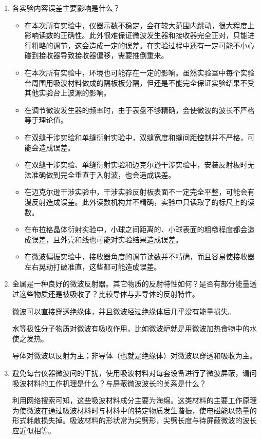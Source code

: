 \documentclass[12pt]{article}
\begin{document}
\begin{enumerate}
    \item {\kaishu 各实验内容误差主要影响是什么？}
    
    \begin{itemize}
        \item 在本次所有实验中，仪器示数不稳定，会在较大范围内跳动，很大程度上影响读数的正确性。此外很难保证微波发生器和接收器完全正对，只能进行粗略的调节，这会造成一定的误差。在实验过程中还有一定可能不小心碰到接收器导致接收器偏移，需要推倒重来。
        \item 在本次所有实验中，环境也可能存在一定的影响。虽然实验室中每个实验台周围用吸波材料做成的隔板板分隔，但还是不能完全保证实验结果不受其他实验台上波源的影响。
        \item 在调节微波发生器的频率时，由于表盘不够精确，会使微波的波长不严格等于理论值。
        \item 在双缝干涉实验和单缝衍射实验中，双缝宽度和缝间距控制并不严格，可能会造成误差。
        \item 在双缝干涉实验、单缝衍射实验和迈克尔逊干涉实验中，安装反射板时无法准确做到完全垂直于入射波，也会造成误差。
        \item 在迈克尔逊干涉实验中，干涉实验反射板表面不一定完全平整，可能会有漫反射造成误差。此外读数机构并不精确，实验中只读取了的标尺上的读数。
        \item 在布拉格晶体衍射实验中，小球之间距离的、小球表面的粗糙程度都会造成误差，且外壳和线也可能对实验结果造成误差。
        \item 在微波偏振实验中，接收器角度的调节读数并不精确，而且容易使接收器左右晃动打破准直，这些都可能造成误差。
    \end{itemize}

    \item {\kaishu 金属是一种良好的微波反射器。其它物质的反射特性如何？是否有部分能量透过这些物质还是被吸收了？比较导体与非导体的反射特性。}
    
    微波可以直接穿透绝缘体，并且微波经过绝缘体后几乎没有能量损失。

    水等极性分子物质对微波有吸收作用，比如微波炉就是用微波加热食物中的水使之发热。

    导体对微波以反射为主；非导体（也就是绝缘体）对微波以穿透和吸收为主。

    \item {\kaishu 避免每台仪器微波间的干扰，使用吸波材料对每套设备进行了微波屏蔽，请问吸波材料的工作机理是什么？与屏蔽微波波长的关系是什么？}
    
    利用网络搜索可知，这些吸波材料成分主要为海绵。这类材料的主要工作原理为使微波在通过吸波材料时与材料中的特定物质发生谐振，使电磁能以热量的形式耗散损失掉。吸波材料的形状常为尖劈形，尖劈长度与待屏蔽微波的波长应近似相等。


\end{enumerate}
\end{document}
